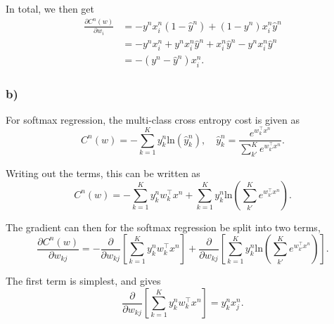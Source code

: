 In total, we then get
\begin{align*}
  \frac{\partial C^n(w)}{\partial w_i} &= -y^n x_i^n (1-\hat{y}^n) + (1-y^n) x_i^n \hat{y}^n \\
                                       &= -y^n x_i^n + y^n x_i^n \hat{y}^n + x_i^n \hat{y}^n - y^n x_i^n \hat{y}^n \\
                                       &= -(y^n - \hat{y}^n) x_i^n.
\end{align*}


\subsubsection*{b)}
For softmax regression, the multi-class cross entropy cost is given as
\begin{equation}\label{eq:softmax_entropy}
  C^n(w) =-\sum_{k=1}^K y_k^n \text{ln}(\hat{y}_k^n), \quad \hat{y}_k^n = \frac{e^{w_k^\top x^n}}{\sum_{k'}^K e^{w_{k'}^\top x^n}}.
\end{equation}

Writing out the terms, this can be written as
\begin{equation*}
  C^n(w) =  -\sum_{k=1}^{K} y_k^n w_k^\top x^n + \sum_{k=1}^K y_k^n \text{ln}\left(\sum_{k'}^K e^{w_{k'}^\top x^n}\right).
\end{equation*}

The gradient can then for the softmax regression be split into two terms,
\begin{equation*}
  \frac{\partial C^n(w)}{\partial w_{kj}} = -\frac{\partial}{\partial w_{kj}} \left[ \sum_{k=1}^{K} y_k^n w_k^\top x^n \right] + \frac{\partial}{\partial w_{kj}} \left[ \sum_{k=1}^K y_k^n \text{ln}\left(\sum_{k'}^K e^{w_{k'}^\top x^n}\right)\right].
\end{equation*}

The first term is simplest, and gives
\begin{equation*}
  \frac{\partial}{\partial w_{kj}} \left[ \sum_{k=1}^{K} y_k^n w_k^\top x^n \right] = y_k^n x_j^n. 
\end{equation*}

